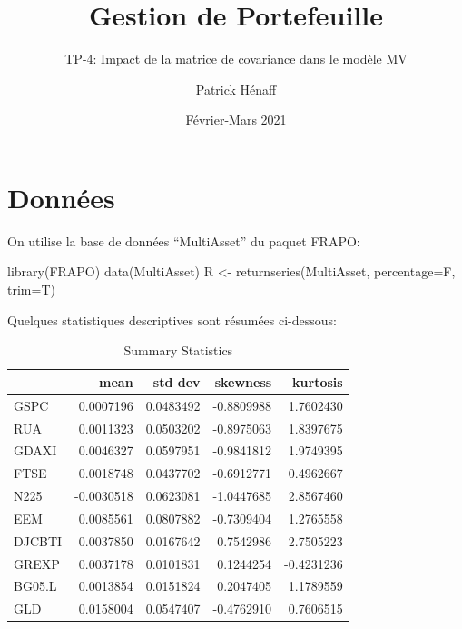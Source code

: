 \documentclass[
]{article}
\title{Gestion de Portefeuille}
\subtitle{TP-4: Impact de la matrice de covariance dans le modèle MV}
\author{Patrick Hénaff}
\date{Février-Mars 2021}
\newenvironment{Shaded}{\begin{snugshade}}{\end{snugshade}}
\newcommand{\AttributeTok}[1]{\textcolor[rgb]{0.77,0.63,0.00}{#1}}
\newcommand{\FunctionTok}[1]{\textcolor[rgb]{0.00,0.00,0.00}{#1}}
\newcommand{\NormalTok}[1]{#1}
\newcommand{\OtherTok}[1]{\textcolor[rgb]{0.56,0.35,0.01}{#1}}
\begin{document}
\maketitle

\hypertarget{donnuxe9es}{%
\section{Données}\label{donnuxe9es}}

On utilise la base de données ``MultiAsset'' du paquet FRAPO:

\begin{Shaded}
\begin{Highlighting}[]
\FunctionTok{library}\NormalTok{(FRAPO)}
\FunctionTok{data}\NormalTok{(MultiAsset)}
\NormalTok{R }\OtherTok{\textless{}{-}} \FunctionTok{returnseries}\NormalTok{(MultiAsset, }\AttributeTok{percentage=}\NormalTok{F, }\AttributeTok{trim=}\NormalTok{T)}
\end{Highlighting}
\end{Shaded}

Quelques statistiques descriptives sont résumées ci-dessous:

\begin{table}[H]

\caption{\label{tab:show-stats}Summary Statistics}
\centering
\begin{tabular}[t]{lrrrr}
\toprule
  & mean & std dev & skewness & kurtosis\\
\midrule
GSPC & 0.0007196 & 0.0483492 & -0.8809988 & 1.7602430\\
RUA & 0.0011323 & 0.0503202 & -0.8975063 & 1.8397675\\
GDAXI & 0.0046327 & 0.0597951 & -0.9841812 & 1.9749395\\
FTSE & 0.0018748 & 0.0437702 & -0.6912771 & 0.4962667\\
N225 & -0.0030518 & 0.0623081 & -1.0447685 & 2.8567460\\
\addlinespace
EEM & 0.0085561 & 0.0807882 & -0.7309404 & 1.2765558\\
DJCBTI & 0.0037850 & 0.0167642 & 0.7542986 & 2.7505223\\
GREXP & 0.0037178 & 0.0101831 & 0.1244254 & -0.4231236\\
BG05.L & 0.0013854 & 0.0151824 & 0.2047405 & 1.1789559\\
GLD & 0.0158004 & 0.0547407 & -0.4762910 & 0.7606515\\
\bottomrule
\end{tabular}
\end{table}
\end{document}
